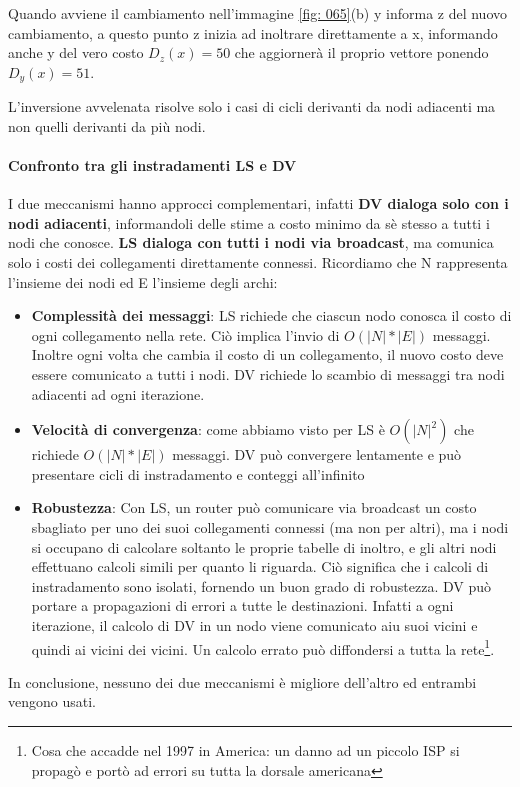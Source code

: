 \documentclass[11pt,a4paper]{book}
\begin{document}
Quando avviene il cambiamento nell'immagine \ref{fig: 065}(b) y informa z del nuovo cambiamento, a questo punto z inizia ad inoltrare direttamente a x, informando anche y del vero costo $D_{z}(x) = 50$ che aggiornerà il proprio vettore ponendo $D_{y}(x) = 51$. 

L'inversione avvelenata risolve solo i casi di cicli derivanti da nodi adiacenti ma non quelli derivanti da più nodi.

\paragraph{Confronto tra gli instradamenti LS e DV}
I due meccanismi hanno approcci complementari, infatti \textbf{DV dialoga solo con i nodi adiacenti}, informandoli delle stime a costo minimo da sè stesso a tutti i nodi che conosce. \textbf{LS dialoga con tutti i nodi via broadcast}, ma comunica solo i costi dei collegamenti direttamente connessi. 
Ricordiamo che N rappresenta l'insieme dei nodi ed E l'insieme degli archi:
\begin{itemize}
	\item \textbf{Complessità dei messaggi}: LS richiede che ciascun nodo conosca il costo di ogni collegamento nella rete. Ciò implica l'invio di $O(|N|*|E|)$ messaggi. Inoltre ogni volta che cambia il costo di un collegamento, il nuovo costo deve essere comunicato a tutti i nodi. DV richiede lo scambio di messaggi tra nodi adiacenti ad ogni iterazione.
	\item \textbf{Velocità di convergenza}: come abbiamo visto per LS è $O(|N|^{2})$ che richiede $O(|N|*|E|)$ messaggi. DV può convergere lentamente e può presentare cicli di instradamento e conteggi all'infinito
	\item \textbf{Robustezza}: Con LS, un router può comunicare via broadcast un costo sbagliato per uno dei suoi collegamenti connessi (ma non per altri), ma i nodi si occupano di calcolare soltanto le proprie tabelle di inoltro, e gli altri nodi effettuano calcoli simili per quanto li riguarda. Ciò significa che i calcoli di instradamento sono isolati, fornendo un buon grado di robustezza. DV può portare a propagazioni di errori a tutte le destinazioni. Infatti a ogni iterazione, il calcolo di DV in un nodo viene comunicato aiu suoi vicini e quindi ai vicini dei vicini. Un calcolo errato può diffondersi a tutta la rete\footnote{Cosa che accadde nel 1997 in America: un danno ad un piccolo ISP si propagò e portò ad errori su tutta la dorsale americana}.
\end{itemize}
In conclusione, nessuno dei due meccanismi è migliore dell'altro ed entrambi vengono usati.
\end{document}

